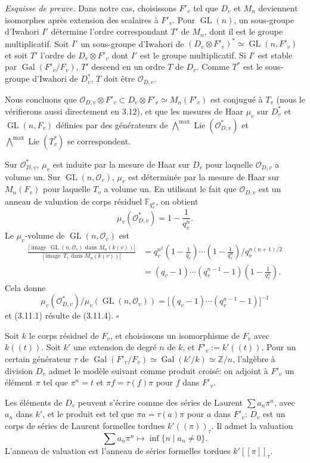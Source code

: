 \documentclass[10pt]{article}
\newcommand{\Z}{\mathbb Z}
\newcommand{\GL}{\operatorname{GL}}
\newcommand{\Gal}{\operatorname{Gal}}
\newcommand{\Lie}{\operatorname{Lie}}
\newcommand{\OO}{\mathcal O}
\theoremstyle{deligne}
\newenvironment{sketchproof}[1][Esquisse de preuve.]{\textit{#1}}{\hfill$\square$}
\newcommand{\heading}[1]{\vspace{0.7em}\noindent{\bfseries #1}\quad}
\begin{document}
\begin{sketchproof}
Dans notre cas, choisissons $F'_v$ tel que $D_v$ et $M_n$ deviennent isomorphes après extension des scalaires à $F'_v$. Pour $\GL(n)$, un sous-groupe d'Iwahori $I'$ détermine l'ordre correspondant $T'$ de $M_n$, dont il est le groupe multiplicatif. Soit $I'$ un sous-groupe d'Iwahori de $(D_v\otimes F'_v)^*\simeq\GL(n,F'_v)$ et soit $T'$ l'ordre de $D_v\otimes F'_v$ dont $I'$ est le groupe multiplicatif. Si $I'$ est stable par $\Gal(F'_v/F_v)$, $T'$ descend en un ordre $T$ de $D_v$. Comme $T^*$ est le sous-groupe d'Iwahori de $D_v^*$, $T$ doit être $\mathcal O_{D,v}$.

Nous concluons que $\mathcal O_{D,v}\otimes F'_v\subset D_v\otimes F'_v\simeq M_n(F'_v)$ est conjugué à $T_v$ (nous le vérifierons aussi directement en 3.12), et que les mesures de Haar $\mu_v$ sur $D_v^*$ et $\GL(n,F_v)$ définies par des générateurs de $\bigwedge^{\max}\Lie(\mathcal O_{D,v}^*)$ et $\bigwedge^{\max}\Lie(T_v^*)$ se correspondent.

Sur $\mathcal O_{D,v}^*$, $\mu_v$ est induite par la mesure de Haar sur $D_v$ pour laquelle $\mathcal O_{D,v}$ a volume un. Sur $\GL(n,\OO_v)$, $\mu_v$ est déterminée par la mesure de Haar sur $M_n(F_v)$ pour laquelle $T_v$ a volume un. En utilisant le fait que $\mathcal O_{D,v}$ est un anneau de valuation de corps résiduel $\mathbb F_{q_v^n}$, on obtient
\[
\mu_v(\mathcal O_{D,v}^*)=1-\frac{1}{q_v^n}.
\]
Le $\mu_v$-volume de $\GL(n,\OO_v)$ est
\begin{align*}
\frac{|\operatorname{image}\,\GL(n,\OO_v)\text{ dans }M_n(k(v))|}{|\operatorname{image}\,T_v\text{ dans }M_n(k(v))|}
&=q_v^{n^2}\left(1-\frac1{q_v}\right)\cdots\left(1-\frac1{q_v^n}\right)/q_v^{n(n+1)/2}\\
&=(q_v-1)\cdots(q_v^{n-1}-1)\left(1-\frac1{q_v^n}\right).
\end{align*}
Cela donne
\[
\mu_v(\mathcal O_{D,v}^*)/\mu_v(\GL(n,\OO_v))=\bigl[(q_v-1)\cdots(q_v^{n-1}-1)\bigr]^{-1}
\]
et (3.11.1) résulte de (3.11.4).
\end{sketchproof}

\heading{3.12.} Soit $k$ le corps résiduel de $F_v$, et choisissons un isomorphisme de $F_v$ avec $k((t))$. Soit $k'$ une extension de degré $n$ de $k$, et $F'_v:=k'((t))$. Pour un certain générateur $\tau$ de $\Gal(F'_v/F_v)\simeq\Gal(k'/k)\simeq\Z/n$, l'algèbre à division $D_v$ admet le modèle suivant comme produit croisé: on adjoint à $F'_v$ un élément $\pi$ tel que $\pi^n=t$ et $\pi f=\tau(f)\pi$ pour $f$ dans $F'_v$.

Les éléments de $D_v$ peuvent s'écrire comme des séries de Laurent $\sum a_n\pi^n$, avec $a_n$ dans $k'$, et le produit est tel que $\pi a=\tau(a)\pi$ pour $a$ dans $F'_v$: $D_v$ est un corps de séries de Laurent formelles tordues $k'((\pi))_\tau$. Il admet la valuation
\[
\sum a_n\pi^n\longmapsto \inf\{n\mid a_n\ne0\}.
\]
L'anneau de valuation est l'anneau de séries formelles tordues $k'[[\pi]]_\tau$.
\end{document}
